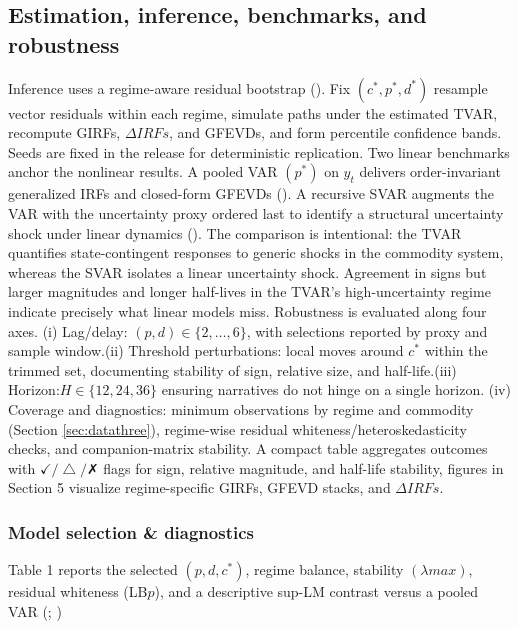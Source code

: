 \documentclass[
  11pt,
]{article}
\begin{document}
\subsection{Estimation, inference, benchmarks, and robustness}\label{sec:econometricthree}

Inference uses a regime-aware residual bootstrap (). Fix \((c^*, p^*, d^*)\) resample vector residuals within each regime, simulate paths under the estimated TVAR, recompute GIRFs, \(\Delta{IRFs}\), and GFEVDs, and form percentile confidence bands. Seeds are fixed in the release for deterministic replication.
Two linear benchmarks anchor the nonlinear results. A pooled VAR \((p^*)\) on \(y_t\) delivers order-invariant generalized IRFs and closed-form GFEVDs (). A recursive SVAR augments the VAR with the uncertainty proxy ordered last to identify a structural uncertainty shock under linear dynamics (). The comparison is intentional: the TVAR quantifies state-contingent responses to generic shocks in the commodity system, whereas the SVAR isolates a linear uncertainty shock. Agreement in signs but larger magnitudes and longer half-lives in the TVAR's high-uncertainty regime indicate precisely what linear models miss.
Robustness is evaluated along four axes. (i) Lag/delay: \((p,d)\in\{2,\ldots,6\}\), with selections reported by proxy and sample window.(ii) Threshold perturbations: local moves around \(c^*\) within the trimmed set, documenting stability of sign, relative size, and half-life.(iii) Horizon:\(H\in\{12,24,36\}\) ensuring narratives do not hinge on a single horizon. (iv) Coverage and diagnostics: minimum observations by regime and commodity (Section \ref{sec:datathree}), regime-wise residual whiteness/heteroskedasticity checks, and companion-matrix stability. A compact table aggregates outcomes with \(✓/△/✗\) flags for sign, relative magnitude, and half-life stability, figures in Section 5 visualize regime-specific GIRFs, GFEVD stacks, and \(\Delta{IRFs}\).

\subsubsection{Model selection \& diagnostics}\label{sec:econometricthreeone}

Table 1 reports the selected \((p, d, c^*)\), regime balance, stability \((\lambda max)\), residual whiteness (LB\(p\)), and a descriptive sup-LM contrast versus a pooled VAR (; )
\end{document}
